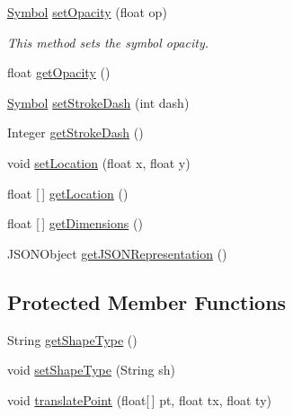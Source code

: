\begin{DoxyCompactItemize}
\mbox{\hyperlink{classbridges_1_1base_1_1_symbol}{Symbol}} \mbox{\hyperlink{classbridges_1_1base_1_1_symbol_abac237b439448cbef3744817d14061c5}{set\+Opacity}} (float op)
\begin{DoxyCompactList}\small\item\em This method sets the symbol opacity. \end{DoxyCompactList}\item 
float \mbox{\hyperlink{classbridges_1_1base_1_1_symbol_af249b2a8a11a70edc8f51ee19e6cd927}{get\+Opacity}} ()
\item 
\mbox{\hyperlink{classbridges_1_1base_1_1_symbol}{Symbol}} \mbox{\hyperlink{classbridges_1_1base_1_1_symbol_ad36224ec7cb588dbbaa8040ef59ffbfc}{set\+Stroke\+Dash}} (int dash)
\item 
Integer \mbox{\hyperlink{classbridges_1_1base_1_1_symbol_a31ff460ae6b24ed968c1045e2533a967}{get\+Stroke\+Dash}} ()
\item 
void \mbox{\hyperlink{classbridges_1_1base_1_1_symbol_a168cea9fd50ad311fe9c74215ab708ac}{set\+Location}} (float x, float y)
\item 
float \mbox{[}$\,$\mbox{]} \mbox{\hyperlink{classbridges_1_1base_1_1_symbol_a67d925fa6fcf9b78c449b63182029e56}{get\+Location}} ()
\item 
float \mbox{[}$\,$\mbox{]} \mbox{\hyperlink{classbridges_1_1base_1_1_symbol_a6cf741f603dd6347325e95a2b4d13d2e}{get\+Dimensions}} ()
\item 
J\+S\+O\+N\+Object \mbox{\hyperlink{classbridges_1_1base_1_1_symbol_aeba4cfa5b39fe03e72a568a8b7452e60}{get\+J\+S\+O\+N\+Representation}} ()
\end{DoxyCompactItemize}
\subsection*{Protected Member Functions}
\begin{DoxyCompactItemize}
\item 
String \mbox{\hyperlink{classbridges_1_1base_1_1_symbol_a10f3cde5331f1af9303b08249e719a9d}{get\+Shape\+Type}} ()
\item 
void \mbox{\hyperlink{classbridges_1_1base_1_1_symbol_adf9559ecef8902f83cbb6bbefdf1c601}{set\+Shape\+Type}} (String sh)
\item 
void \mbox{\hyperlink{classbridges_1_1base_1_1_symbol_affb384e1e7e22d7bcb6ca0bf0d4ebbc3}{translate\+Point}} (float\mbox{[}$\,$\mbox{]} pt, float tx, float ty)
\end{DoxyCompactItemize}
